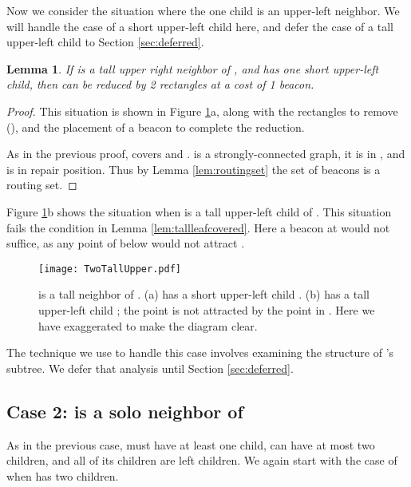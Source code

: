 \documentclass{article}
\newtheorem{lemma}{Lemma}
\begin{document}
		Now we consider the situation where the one child is an upper-left neighbor.
		We will handle the case of a short upper-left child here, and defer
		the case of a tall upper-left child to Section \ref{sec:deferred}.

		\begin{lemma}\label{lem:upperleft}
			If  is a tall upper right neighbor of ,
			and  has one short upper-left child,
			then  can be reduced by 2 rectangles at a cost of 1 beacon.
		\end{lemma}
		\begin{proof}
			This situation is shown in  Figure \ref{fig:twotallupper}a,
			along with the rectangles to remove (), and the 
			placement of a beacon  to complete the reduction.
			
			As in the previous proof,  covers  and .
			 is a strongly-connected graph,
			it is in , and is in repair position.
			Thus by Lemma \ref{lem:routingset} the set of beacons  is a routing set.
		\end{proof}


		Figure \ref{fig:twotallupper}b shows the situation when  is a tall
		upper-left child of .  This
		situation fails the condition in Lemma \ref{lem:tallleafcovered}.
		Here a beacon at  would not suffice, as
		any point of  below  would not attract .  


		\begin{figure}[htbp] 
			\begin{center}
				\texttt{[image: TwoTallUpper.pdf]} 
			\end{center}
			\caption{ 
				 is a tall neighbor of .
				(a)  has a short upper-left child .
				(b)  has a tall  upper-left child ; the point
					 is not attracted by the point in .
					Here we have exaggerated  to make the
					diagram clear.
			}
			\label{fig:twotallupper}
		\end{figure}
		
		The technique we use to handle this case involves examining the structure of
		's subtree.  We defer that analysis until
		Section \ref{sec:deferred}.


	\subsection{Case 2:  is a solo neighbor of }\label{sec:atwosolo}

		As in the previous case,  must have at least one child, can have at most
		two children, and all of its children are left children.  We again start with 
		the case of when  has two children.
\end{document}
